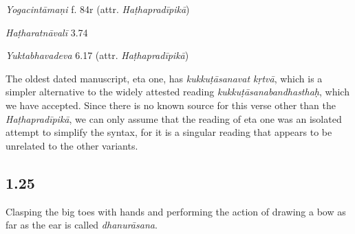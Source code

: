 \begin{ekdosis}
\begin{testimonia}[hp01_024]
\emph{Yogacintāmaṇi} f. 84r (attr. \emph{Haṭhapradīpikā})

\begin{versinnote}
\end{versinnote}

\emph{Haṭharatnāvalī} 3.74

\begin{versinnote}
\end{versinnote}

\emph{Yuktabhavadeva} 6.17 (attr. \emph{Haṭhapradīpikā})

\begin{versinnote}
\end{versinnote}

\end{testimonia}

\begin{philcomm}[hp01_024]
The oldest dated manuscript, eta one, has \emph{kukkuṭāsanavat kṛtvā}, which is a simpler alternative to the widely attested reading \emph{kukkuṭāsanabandhasthaḥ}, which we have accepted. Since there is no known source for this verse other than the \emph{Haṭhapradīpikā}, we can only assume that the reading of eta one was an isolated attempt to simplify the syntax, for it is a singular reading that appears to be unrelated to the other variants.
\end{philcomm}

\subsection*{1.25}
\begin{translation}[hp01_025]
Clasping the big toes with hands and performing the action of drawing a bow as far as the ear is called \emph{dhanurāsana}.
\end{translation}


\end{ekdosis}
